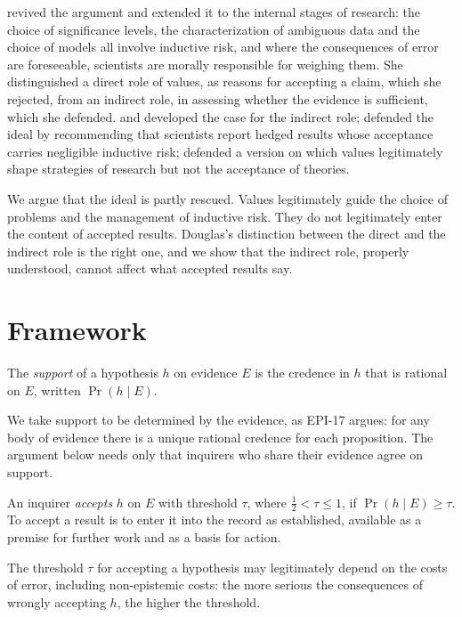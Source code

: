 \documentclass{situationist-preprint}
\begin{document}
\citet{Douglas2000,Douglas2009} revived the argument and extended it to the internal stages of research: the choice of significance levels, the characterization of ambiguous data and the choice of models all involve inductive risk, and where the consequences of error are foreseeable, scientists are morally responsible for weighing them. She distinguished a direct role of values, as reasons for accepting a claim, which she rejected, from an indirect role, in assessing whether the evidence is sufficient, which she defended. \citet{Steel2010} and \citet{Elliott2017} developed the case for the indirect role; \citet{Betz2013} defended the ideal by recommending that scientists report hedged results whose acceptance carries negligible inductive risk; \citet{Lacey1999} defended a version on which values legitimately shape strategies of research but not the acceptance of theories.

We argue that the ideal is partly rescued. Values legitimately guide the choice of problems and the management of inductive risk. They do not legitimately enter the content of accepted results. Douglas's distinction between the direct and the indirect role is the right one, and we show that the indirect role, properly understood, cannot affect what accepted results say.

\section{Framework}

\begin{definition}[Support]\label{d:support}
The \emph{support} of a hypothesis $h$ on evidence $E$ is the credence in $h$ that is rational on $E$, written $\Pr(h \mid E)$.
\end{definition}

We take support to be determined by the evidence, as EPI-17 argues: for any body of evidence there is a unique rational credence for each proposition. The argument below needs only that inquirers who share their evidence agree on support.

\begin{definition}[Acceptance]\label{d:accept}
An inquirer \emph{accepts} $h$ on $E$ with threshold $\tau$, where $\tfrac12 < \tau \le 1$, if $\Pr(h \mid E) \ge \tau$. To accept a result is to enter it into the record as established, available as a premise for further work and as a basis for action.
\end{definition}

\begin{principle}\label{p:risk}
The threshold $\tau$ for accepting a hypothesis may legitimately depend on the costs of error, including non-epistemic costs: the more serious the consequences of wrongly accepting $h$, the higher the threshold.
\end{principle}
\end{document}
